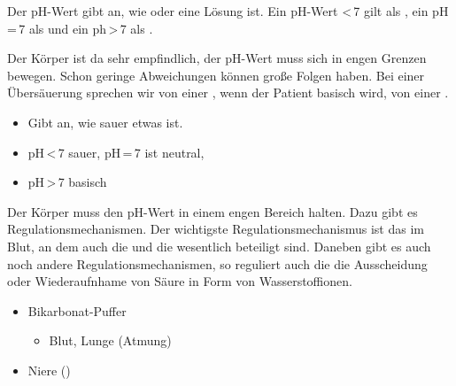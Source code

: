 {%
Der pH-Wert gibt an, wie  oder  eine
Lösung ist. Ein pH-Wert {\textless}\,7 gilt als ,
ein pH\,=\,7 als  und ein ph\,{\textgreater}\,7
als .

Der Körper ist da
sehr empfindlich, der pH-Wert muss sich in engen Grenzen
bewegen. Schon geringe Abweichungen können große Folgen
haben. Bei einer Übersäuerung sprechen wir von einer
, wenn der Patient basisch wird,
von einer .
 

}{
\begin{itemize}
  \item Gibt an, wie sauer etwas ist.
  \item pH\,{\textless}\,7 {\dotfill} sauer, 
  pH\,=\,7 ist neutral,
  \item pH\,{\textgreater}\,7 {\dotfill} basisch
\end{itemize}
}{}{}{}

{%
Der Körper muss den pH-Wert in einem engen Bereich halten.
Dazu gibt es Regulationsmechanismen. Der wichtigste
Regulationsmechanismus ist das
 im Blut, an
dem auch die  und die  wesentlich
beteiligt sind. Daneben gibt es auch noch andere
Regulationsmechanismen, so reguliert auch die  die
Ausscheidung oder Wiederaufnhame von Säure in Form
von Wasserstoffionen.

}{
\begin{itemize}
  \item Bikarbonat-Puffer\begin{itemize}
    \item Blut, Lunge (Atmung)
  \end{itemize}
  \item Niere ()
\end{itemize}
}{}{}{}

